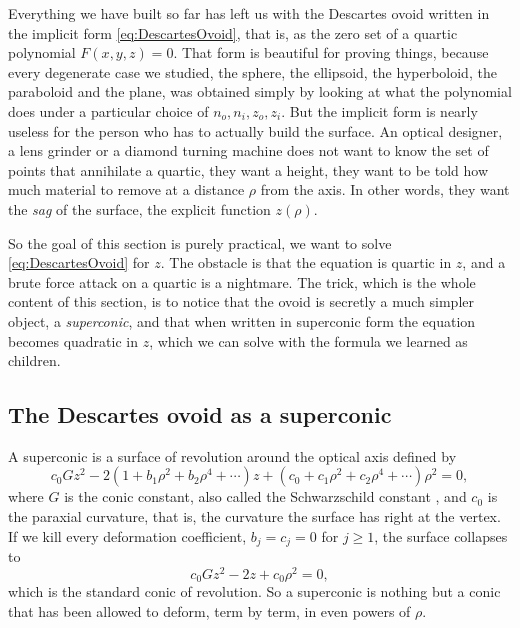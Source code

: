                 Everything we have built so far has left us with the Descartes ovoid written in the implicit form \ref{eq:DescartesOvoid}, that is, as the zero set of a quartic polynomial $F(x,y,z)=0$. That form is beautiful for proving things, because every degenerate case we studied, the sphere, the ellipsoid, the hyperboloid, the paraboloid and the plane, was obtained simply by looking at what the polynomial does under a particular choice of $n_o,n_i,z_o,z_i$. But the implicit form is nearly useless for the person who has to actually build the surface. An optical designer, a lens grinder or a diamond turning machine does not want to know the set of points that annihilate a quartic, they want a height, they want to be told how much material to remove at a distance $\rho$ from the axis. In other words, they want the \textit{sag} of the surface, the explicit function $z(\rho)$.

                So the goal of this section is purely practical, we want to solve \ref{eq:DescartesOvoid} for $z$. The obstacle is that the equation is quartic in $z$, and a brute force attack on a quartic is a nightmare. The trick, which is the whole content of this section, is to notice that the ovoid is secretly a much simpler object, a \textit{superconic}, and that when written in superconic form the equation becomes quadratic in $z$, which we can solve with the formula we learned as children.

            \subsection{The Descartes ovoid as a superconic}

                A superconic is a surface of revolution around the optical axis defined by
                \begin{equation}\label{eq:SuperconicGeneral}
                    c_0Gz^2 - 2\left( 1 + b_1\rho^2 + b_2\rho^4 + \cdots \right)z + \left( c_0 + c_1\rho^2 + c_2\rho^4 + \cdots \right)\rho^2 = 0,
                \end{equation}
                where $G$ is the conic constant, also called the Schwarzschild constant \citep{schwarzschild1905untersuchungen}, and $c_0$ is the paraxial curvature, that is, the curvature the surface has right at the vertex. If we kill every deformation coefficient, $b_j = c_j = 0$ for $j\geq 1$, the surface collapses to
                \begin{equation}\label{eq:StandardConic}
                    c_0Gz^2 - 2z + c_0\rho^2 = 0,
                \end{equation}
                which is the standard conic of revolution. So a superconic is nothing but a conic that has been allowed to deform, term by term, in even powers of $\rho$.

